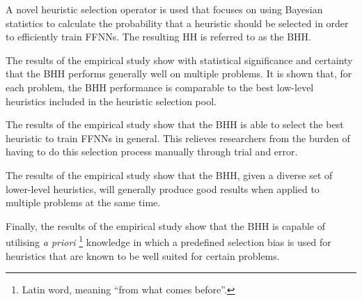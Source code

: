 
\begin{highlights}
	\item A novel heuristic selection operator is used that focuses on using Bayesian statistics to calculate the probability that a heuristic should be selected in order to efficiently train \acp{FFNN}. The resulting \acs{HH} is referred to as the \acf{BHH}.

	\item The results of the empirical study show with statistical significance and certainty that the \Acs{BHH} performs generally well on multiple problems. It is shown that, for each problem, the \Acs{BHH} performance is comparable to the best low-level heuristics included in the heuristic selection pool.

	\item The results of the empirical study show that the \Acs{BHH} is able to select the best heuristic to train \acp{FFNN} in general. This relieves researchers from the burden of having to do this selection process manually through trial and error.

	\item The results of the empirical study show that the \Acs{BHH}, given a diverse set of lower-level heuristics, will generally produce good results when applied to multiple problems at the same time.

	\item Finally, the results of the empirical study show that the \Acs{BHH} is capable of utilising \textit{a priori} \footnote{Latin word, meaning ``from what comes before''.} knowledge in which a predefined selection bias is used for heuristics that are known to be well suited for certain problems.
\end{highlights}